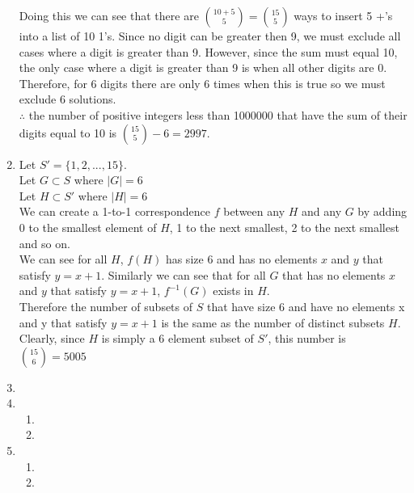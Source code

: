 \documentclass[11pt]{article}
\begin{document}
\begin{enumerate}[]
	Doing this we can see that there are $\binom{10+5}{5} = \binom{15}{5}$ ways to insert 5 +'s into a list of 10 1's. Since no digit can be greater then 9, we must exclude all cases where a digit is greater than 9. However, since the sum must equal 10, the only case where a digit is greater than 9 is when all other digits are 0. Therefore, for 6 digits there are only 6 times when this is true so we must exclude 6 solutions.\\
	$\therefore$ the number of positive integers less than 1000000 that have the sum of their digits equal to 10 is $\binom{15}{5} - 6 = 2997$.
\item
	Let $S'=\{1,2,...,15\}$.\\
	Let $G \subset S$ where $|G|=6$\\
	Let $H \subset S'$ where $|H|=6$\\
	We can create a 1-to-1 correspondence $f$ between any $H$ and any  $G$ by adding 0 to the smallest element of $H$, 1 to the next smallest, 2 to the next smallest and so on.\\
	We can see for all $H$, $f(H)$ has size 6 and has no elements  $x$ and $y$ that satisfy $y=x+1$. Similarly we can see that for all $G$ that has no elements  $x$ and $y$ that satisfy $y=x+1$, $f^{-1}(G)$ exists in $H$.\\
	Therefore the number of subsets of $S$ that have size 6 and have no elements x and y that satisfy $y=x+1$ is the same as the number of distinct subsets $H$. Clearly, since $H$ is simply a 6 element subset of $S'$, this number is $\binom{15}{6} = 5005$
	
\item
\item
\begin{enumerate}[label=\alph*]
\item
\item
\end{enumerate}
\item
\begin{enumerate}[label=\alph*]
\item
\item
\end{enumerate}

\end{enumerate}
\end{document}
